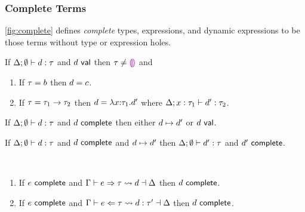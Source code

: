 \subsubsection{Complete Terms}\label{sec:complete-terms}

\autoref{fig:complete} defines \emph{complete} types, expressions, and
dynamic expressions to be those terms without type or expression holes.
\begin{theorem}
  If $\Delta; \emptyset \vdash d : \tau$ and $d~\mathsf{val}$
  then $\tau\neq\textcolor{violet}{\llparenthesis}\textcolor{violet}{\rrparenthesis}$ and
  \begin{enumerate}[label=(\alph*)]
    \item If $\tau=b$ then $d=c$.
    \item If $\tau=\tau_1 \rightarrow \tau_2$
          then $d=\lambda x{:}\tau_1.d'$
          where $\Delta; x : \tau_1 \vdash d' : \tau_2$.
  \end{enumerate}
\end{theorem}

\begin{theorem}
  If $\Delta; \emptyset \vdash d : \tau$
  and $d~\mathsf{complete}$
  then either $d \mapsto d'$
  or $d~\mathsf{val}$.
\end{theorem}

\begin{theorem}
  If $\Delta; \emptyset \vdash d : \tau$
  and $d~\mathsf{complete}$
  and $d \mapsto d'$
  then $\Delta; \emptyset \vdash d' : \tau$
  and $d'~\mathsf{complete}$.
\end{theorem}

\begin{theorem} ~
  \begin{enumerate}
    \item
      If $e~\mathsf{complete}$
      and $\Gamma \vdash e \Rightarrow \tau \leadsto d \dashv \Delta$
      then $d~\mathsf{complete}$.
    \item
      If $e~\mathsf{complete}$
      and $\Gamma \vdash e \Leftarrow \tau \leadsto d : \tau' \dashv \Delta$
      then $d~\mathsf{complete}$.
  \end{enumerate}
\end{theorem}






